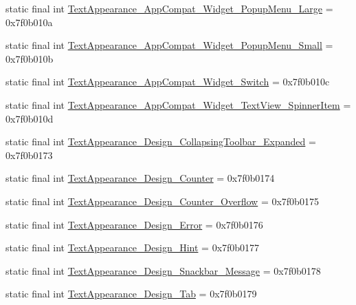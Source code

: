\begin{CompactItemize}
\item 
static final int \hyperlink{classandroid_1_1support_1_1graphics_1_1drawable_1_1animated_1_1_r_1_1style_b6b94ac2c3c86a1f274ec63eea6d2d50}{TextAppearance\_\-AppCompat\_\-Widget\_\-PopupMenu\_\-Large} = 0x7f0b010a
\item 
static final int \hyperlink{classandroid_1_1support_1_1graphics_1_1drawable_1_1animated_1_1_r_1_1style_5bd973ad72ecd7799de653babc600265}{TextAppearance\_\-AppCompat\_\-Widget\_\-PopupMenu\_\-Small} = 0x7f0b010b
\item 
static final int \hyperlink{classandroid_1_1support_1_1graphics_1_1drawable_1_1animated_1_1_r_1_1style_50177daaa098674fac0bd2c162146684}{TextAppearance\_\-AppCompat\_\-Widget\_\-Switch} = 0x7f0b010c
\item 
static final int \hyperlink{classandroid_1_1support_1_1graphics_1_1drawable_1_1animated_1_1_r_1_1style_210e1d97dcf5607fc09f41c142c587a0}{TextAppearance\_\-AppCompat\_\-Widget\_\-TextView\_\-SpinnerItem} = 0x7f0b010d
\item 
static final int \hyperlink{classandroid_1_1support_1_1graphics_1_1drawable_1_1animated_1_1_r_1_1style_c58d9691a77ecc80be6f0fdff19d15fe}{TextAppearance\_\-Design\_\-CollapsingToolbar\_\-Expanded} = 0x7f0b0173
\item 
static final int \hyperlink{classandroid_1_1support_1_1graphics_1_1drawable_1_1animated_1_1_r_1_1style_310907ef533d9c29270ff7689694bea5}{TextAppearance\_\-Design\_\-Counter} = 0x7f0b0174
\item 
static final int \hyperlink{classandroid_1_1support_1_1graphics_1_1drawable_1_1animated_1_1_r_1_1style_1a49522ddbe79765879fc94288fd6eec}{TextAppearance\_\-Design\_\-Counter\_\-Overflow} = 0x7f0b0175
\item 
static final int \hyperlink{classandroid_1_1support_1_1graphics_1_1drawable_1_1animated_1_1_r_1_1style_3bbf8292b508c10cbc8719d4d3b9e7fe}{TextAppearance\_\-Design\_\-Error} = 0x7f0b0176
\item 
static final int \hyperlink{classandroid_1_1support_1_1graphics_1_1drawable_1_1animated_1_1_r_1_1style_889beb1459d6a8a6405690f35fc08766}{TextAppearance\_\-Design\_\-Hint} = 0x7f0b0177
\item 
static final int \hyperlink{classandroid_1_1support_1_1graphics_1_1drawable_1_1animated_1_1_r_1_1style_dd70c27c82745740ebd549d031e38338}{TextAppearance\_\-Design\_\-Snackbar\_\-Message} = 0x7f0b0178
\item 
static final int \hyperlink{classandroid_1_1support_1_1graphics_1_1drawable_1_1animated_1_1_r_1_1style_66c4b6aeddfd33fe33950cebd8803ceb}{TextAppearance\_\-Design\_\-Tab} = 0x7f0b0179

\end{CompactItemize}
